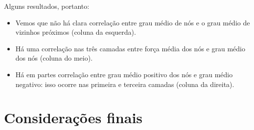 \documentclass{article}
\begin{document}
            Alguns resultados, portanto:

            \begin{itemize}
                \item Vemos que não há clara correlação entre grau médio de nós e o grau médio de vizinhos próximos (coluna da esquerda).
                \item Há uma correlação nas três camadas entre força média dos nós e grau médio dos nós (coluna do meio).
                \item Há em partes correlação entre grau médio positivo dos nós e grau médio negativo: isso ocorre nas primeira e terceira camadas (coluna da direita).
            \end{itemize}

    \section{Considerações finais}

    
    
\end{document}
